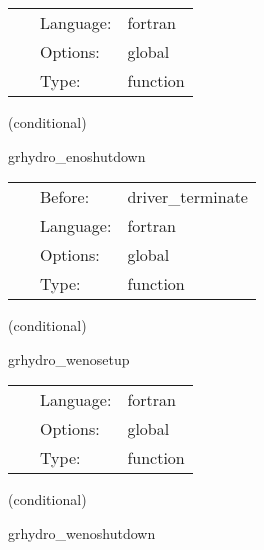 \documentclass{article}
\begin{document}
\hspace{5mm}

 \begin{tabular*}{160mm}{cll} 
~ & Language:  & fortran \\ 
~ & Options:  & global \\ 
~ & Type:  & function \\ 
\end{tabular*} 


\vspace{5mm}

   (conditional) 

\hspace{5mm} grhydro\_enoshutdown 

\hspace{5mm}{\it deallocate eno coefficients } 


\hspace{5mm}

 \begin{tabular*}{160mm}{cll} 
~ & Before:  & driver\_terminate \\ 
~ & Language:  & fortran \\ 
~ & Options:  & global \\ 
~ & Type:  & function \\ 
\end{tabular*} 


\vspace{5mm}

   (conditional) 

\hspace{5mm} grhydro\_wenosetup 

\hspace{5mm}{\it coefficients for weno reconstruction } 


\hspace{5mm}

 \begin{tabular*}{160mm}{cll} 
~ & Language:  & fortran \\ 
~ & Options:  & global \\ 
~ & Type:  & function \\ 
\end{tabular*} 


\vspace{5mm}

   (conditional) 

\hspace{5mm} grhydro\_wenoshutdown 
\end{document}
